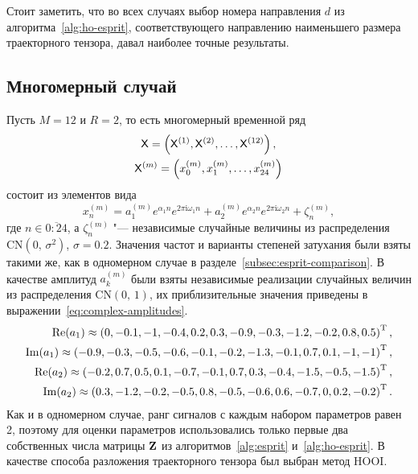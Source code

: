 \documentclass[specialist,
  substylefile=spbu_report.rtx,
subf,href,colorlinks=true, 12pt]{disser}
\theoremstyle{plain}
\theoremstyle{definition}
\theoremstyle{remark}
\newcommand{\iu}{\mathrm{i}}
\begin{document}
Стоит заметить, что во всех случаях выбор номера направления $d$ из
алгоритма~\ref{alg:ho-esprit}, соответствующего направлению
наименьшего размера
траекторного тензора, давал наиболее точные результаты.

\subsection{Многомерный случай}\label{subsec:mv-esprit-comparison}
Пусть $M=12$ и $R=2$, то есть многомерный временной ряд
\begin{gather*}
  \mathsf{X} = \left(\mathsf{X}^{(1)}, \mathsf{X}^{(2)}, \ldots, \mathsf{X}^{(12)}\right),\\
  \mathsf{X}^{(m)} = \left(x_0^{(m)}, x_1^{(m)}, \ldots, x_{24}^{(m)}\right)
\end{gather*}
состоит из элементов вида
\[
  x_n^{(m)} = a_1^{(m)} e^{ \alpha_1 n }
  e^{2 \pi \iu \omega_1 n} +
  a_2^{(m)} e^{ \alpha_2 n }
  e^{2 \pi \iu \omega_2 n} + \zeta_n^{(m)},
\]
где $n \in \overline{0:24}$, а $\zeta_n^{(m)}$ "--- независимые
случайные величины из
распределения $\mathrm{CN}(0,\, \sigma^2)$, $\sigma=0.2$.
Значения частот и варианты степеней затухания были взяты такими же, как
в одномерном случае в разделе~\ref{subsec:esprit-comparison}.
В качестве амплитуд $a_k^{(m)}$ были взяты независимые реализации
случайных величин из распределения $\mathrm{CN}(0,\, 1)$,
их приблизительные значения приведены в
выражении~\eqref{eq:complex-amplitudes}.
\begin{gather}
  \label{eq:complex-amplitudes}
  \begin{split}
    \operatorname{Re}(a_1) \approx \left( 0, -0.1, -1, -0.4, 0.2,
    0.3, -0.9, -0.3, -1.2, -0.2, 0.8, 0.5\right)^{\mathrm{T}}, \\
    \operatorname{Im}(a_1) \approx \left(-0.9, -0.3, -0.5, -0.6,
    -0.1, -0.2, -1.3, -0.1, 0.7, 0.1, -1, -1 \right)^{\mathrm{T}}, \\
    \operatorname{Re}(a_2) \approx \left( -0.2, 0.7, 0.5, 0.1, -0.7,
    -0.1, 0.7, 0.3, -0.4, -1.5, -0.5, -1.5\right)^{\mathrm{T}}, \\
    \operatorname{Im}(a_2) \approx \left( 0.3, -1.2, -0.2, -0.5, 0.8,
    -0.5, -0.6, 0.6, -0.7, 0, 0.2, -0.2\right)^{\mathrm{T}}. \\
  \end{split}
\end{gather}
Как и в одномерном случае, ранг сигналов с каждым набором параметров равен 2,
поэтому для оценки параметров использовались только первые два собственных
числа матрицы $\mathbf{Z}$ из алгоритмов~\ref{alg:esprit} и~\ref{alg:ho-esprit}.
В качестве способа разложения траекторного тензора был выбран метод HOOI.
\end{document}
